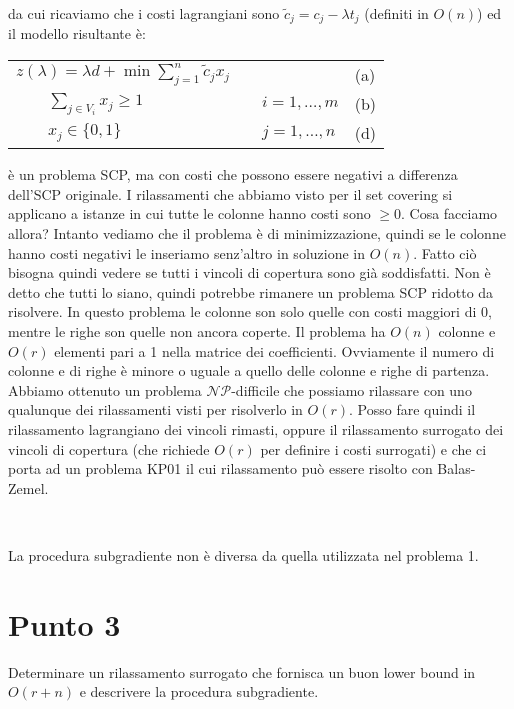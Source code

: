 \documentclass[11pt]{book}
\begin{document}
da cui ricaviamo che i costi lagrangiani sono $\tilde{c}_j = c_j -
\lambda t_j$ (definiti in $O(n)$) ed il modello risultante \`e:

\begin{center}
\begin{tabular}{lp{2cm}ll}
  $z(\lambda) = \lambda d + \min \sum\limits_{j=1}^n \tilde{c}_jx_j$ & & & (a)\\
  $\qquad \sum\limits_{j\in V_i}x_j \geq 1$ & & $i=1,\dots,m$ & (b)\\
  $\qquad x_j \in\{0,1\}$ & & $j = 1,\dots,n$ & (d) \\
\end{tabular}
\end{center}

\`e un problema SCP, ma con costi che possono essere negativi a
differenza dell'SCP originale. I rilassamenti che abbiamo visto per il
set covering si applicano a istanze in cui tutte le colonne hanno
costi sono $\geq 0$. Cosa facciamo allora? Intanto vediamo che il
problema \`e di minimizzazione, quindi se le colonne hanno costi
negativi le inseriamo senz'altro in soluzione in $O(n)$. Fatto ci\`o
bisogna quindi vedere se tutti i vincoli di copertura sono gi\`a
soddisfatti. Non \`e detto che tutti lo siano, quindi potrebbe
rimanere un problema SCP ridotto da risolvere. In questo problema le
colonne son solo quelle con costi maggiori di 0, mentre le righe son
quelle non ancora co\-per\-te. Il problema ha $O(n)$ colonne e $O(r)$
elementi pari a 1 nella matrice dei coefficienti. Ovviamente il numero
di colonne e di righe \`e minore o uguale a quello delle colonne e
righe di partenza. Abbiamo ottenuto un problema
$\mathcal{NP}$-difficile che possiamo rilassare con uno qualunque dei
rilassamenti visti per risolverlo in $O(r)$. Posso fare quindi il
rilassamento lagrangiano dei vincoli rimasti, oppure il rilassamento
surrogato dei vincoli di copertura (che richiede $O(r)$ per definire i
costi surrogati) e che ci porta ad un problema KP01 il cui
rilassamento pu\`o essere risolto con Balas-Zemel.

\

La procedura subgradiente non \`e diversa da quella utilizzata nel
problema 1.

\section*{Punto 3}

Determinare un rilassamento surrogato che fornisca un buon lower bound
in $O(r+n)$ e descrivere la procedura subgradiente.
\end{document}
